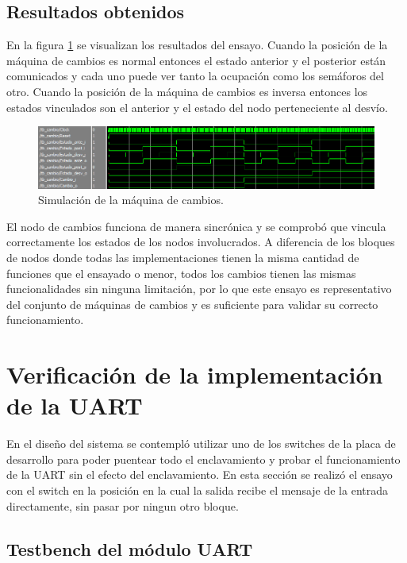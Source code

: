 	\subsection{Resultados obtenidos}
			
		En la figura \ref{fig:Test_Cambios} se visualizan los resultados del ensayo. Cuando la posición de la máquina de cambios es normal entonces el estado anterior y el posterior están comunicados y cada uno puede ver tanto la ocupación como los semáforos del otro. Cuando la posición de la máquina de cambios es inversa entonces los estados vinculados son el anterior y el estado del nodo perteneciente al desvío.
		
		\begin{figure}[h]
		\centering
		\includegraphics[scale=0.55]{./Figures/Test/Cambio}
			\caption{Simulación de la máquina de cambios.}
			\label{fig:Test_Cambios}
		\end{figure}
			
		\vspace{5cm}
			
		El nodo de cambios funciona de manera sincrónica y se comprobó que vincula correctamente los estados de los nodos involucrados. A diferencia de los bloques de nodos donde todas las implementaciones tienen la misma cantidad de funciones que el ensayado o menor, todos los cambios tienen las mismas funcionalidades sin ninguna limitación, por lo que este ensayo es representativo del conjunto de máquinas de cambios y es suficiente para validar su correcto funcionamiento.
				
\section{Verificación de la implementación de la UART}

	En el diseño del sistema se contempló utilizar uno de los switches de la placa de desarrollo para poder puentear todo el enclavamiento y probar el funcionamiento de la UART sin el efecto del enclavamiento. En esta sección se realizó el ensayo con el switch en la posición en la cual la salida recibe el mensaje de la entrada directamente, sin pasar por ningun otro bloque.

	\subsection{Testbench del módulo UART}
			
